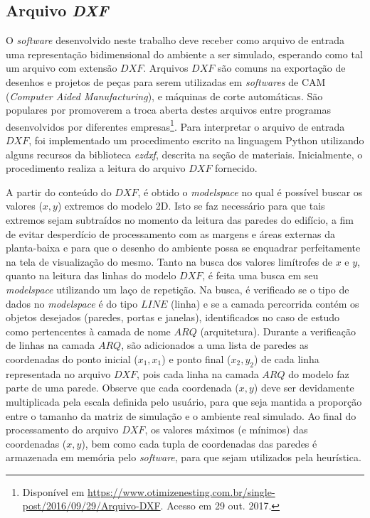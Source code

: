 \documentclass[
	12pt,				%
	twoside,			%
	a4paper,			%
	english,			%
	french,				%
	spanish,			%
	brazil				%
	]{abntex2}
\begin{document}
\subsection{\texorpdfstring{Arquivo
\emph{DXF}}{Arquivo DXF}}\label{arquivo-dxf}

O \emph{software} desenvolvido neste trabalho deve receber como arquivo
de entrada uma representação bidimensional do ambiente a ser simulado,
esperando como tal um arquivo com extensão \(DXF\). Arquivos \(DXF\) são
comuns na exportação de desenhos e projetos de peças para serem
utilizadas em \emph{softwares} de CAM (\emph{Computer Aided
Manufacturing}), e máquinas de corte automáticas. São populares por
promoverem a troca aberta destes arquivos entre programas desenvolvidos
por diferentes empresas\footnote{Disponível em
  \url{https://www.otimizenesting.com.br/single-post/2016/09/29/Arquivo-DXF}.
  Acesso em 29 out. 2017.}. Para interpretar o arquivo de entrada
\(DXF\), foi implementado um procedimento escrito na linguagem Python
utilizando alguns recursos da biblioteca \emph{ezdxf}, descrita na seção
de materiais. Inicialmente, o procedimento realiza a leitura do arquivo
\(DXF\) fornecido.

A partir do conteúdo do \(DXF\), é obtido o \emph{modelspace} no qual é
possível buscar os valores (\(x, y\)) extremos do modelo 2D. Isto se faz
necessário para que tais extremos sejam subtraídos no momento da leitura
das paredes do edifício, a fim de evitar desperdício de processamento
com as margens e áreas externas da planta-baixa e para que o desenho do
ambiente possa se enquadrar perfeitamente na tela de visualização do
mesmo. Tanto na busca dos valores limítrofes de \(x\) e \(y\), quanto na
leitura das linhas do modelo \(DXF\), é feita uma busca em seu
\emph{modelspace} utilizando um laço de repetição. Na busca, é
verificado se o tipo de dados no \emph{modelspace} é do tipo \(LINE\)
(linha) e se a camada percorrida contém os objetos desejados (paredes,
portas e janelas), identificados no caso de estudo como pertencentes à
camada de nome \(ARQ\) (arquitetura). Durante a verificação de linhas na
camada \(ARQ\), são adicionados a uma lista de paredes as coordenadas do
ponto inicial (\(x_{1},x_{1}\)) e ponto final (\(x_{2},y_{2}\)) de cada
linha representada no arquivo \(DXF\), pois cada linha na camada \(ARQ\)
do modelo faz parte de uma parede. Observe que cada coordenada
(\(x, y\)) deve ser devidamente multiplicada pela escala definida pelo
usuário, para que seja mantida a proporção entre o tamanho da matriz de
simulação e o ambiente real simulado. Ao final do processamento do
arquivo \(DXF\), os valores máximos (e mínimos) das coordenadas
(\(x, y\)), bem como cada tupla de coordenadas das paredes é armazenada
em memória pelo \emph{software}, para que sejam utilizados pela
heurística.
\end{document}
